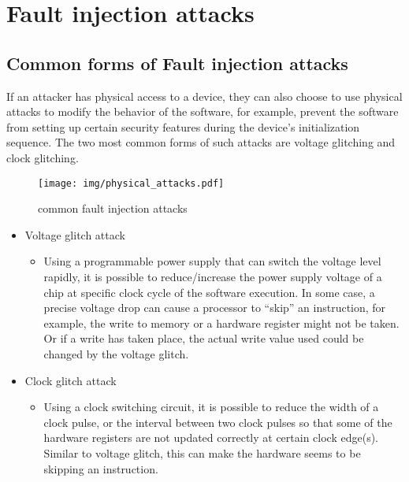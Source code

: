 \documentclass[
  a4paper,
]{report}
\providecommand{\tightlist}{%
  \setlength{\itemsep}{0pt}\setlength{\parskip}{0pt}}
\begin{document}
\section{Fault injection attacks}\label{fault-injection-attacks}

\subsection{Common forms of Fault injection
attacks}\label{common-forms-of-fault-injection-attacks}

If an attacker has physical access to a device, they can also choose to
use physical attacks to modify the behavior of the software, for
example, prevent the software from setting up certain security features
during the device's initialization sequence. The two most common forms
of such attacks are voltage glitching and clock glitching.

\begin{figure}
\centering
\texttt{[image: img/physical\_attacks.pdf]}
\caption{common fault injection attacks}
\end{figure}

\begin{itemize}
\tightlist
\item
  Voltage glitch attack

  \begin{itemize}
  \tightlist
  \item
    Using a programmable power supply that can switch the voltage level
    rapidly, it is possible to reduce/increase the power supply voltage
    of a chip at specific clock cycle of the software execution. In some
    case, a precise voltage drop can cause a processor to ``skip'' an
    instruction, for example, the write to memory or a hardware register
    might not be taken. Or if a write has taken place, the actual write
    value used could be changed by the voltage glitch.
  \end{itemize}
\item
  Clock glitch attack

  \begin{itemize}
  \tightlist
  \item
    Using a clock switching circuit, it is possible to reduce the width
    of a clock pulse, or the interval between two clock pulses so that
    some of the hardware registers are not updated correctly at certain
    clock edge(s). Similar to voltage glitch, this can make the hardware
    seems to be skipping an instruction.
  \end{itemize}
\end{itemize}
\end{document}
